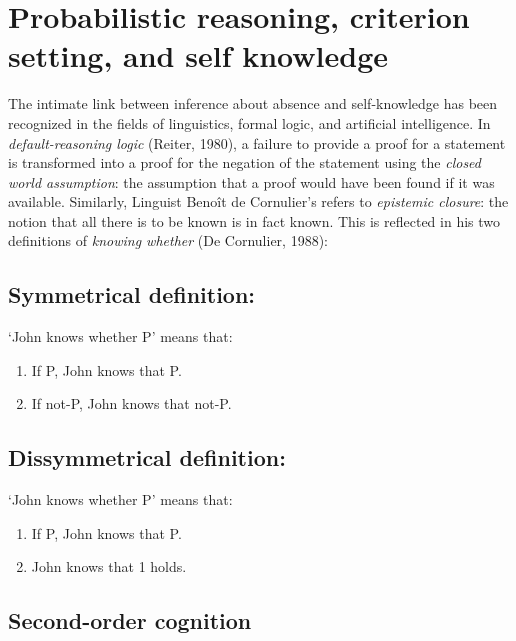 \documentclass[12pt,twoside]{reedthesis}
\providecommand{\tightlist}{%
  \setlength{\itemsep}{0pt}\setlength{\parskip}{0pt}}
\begin{document}
\hypertarget{formalabsence}{%
\section{Probabilistic reasoning, criterion setting, and self knowledge}\label{formalabsence}}

The intimate link between inference about absence and self-knowledge has been recognized in the fields of linguistics, formal logic, and artificial intelligence. In \emph{default-reasoning logic} (Reiter, 1980), a failure to provide a proof for a statement is transformed into a proof for the negation of the statement using the \emph{closed world assumption}: the assumption that a proof would have been found if it was available. Similarly, Linguist Benoît de Cornulier's refers to \emph{epistemic closure}: the notion that all there is to be known is in fact known. This is reflected in his two definitions of \emph{knowing whether} (De Cornulier, 1988):

\hypertarget{symmetrical-definition}{%
\subsection*{Symmetrical definition:}\label{symmetrical-definition}}

`John knows whether P' means that:
\begin{enumerate}
\def\labelenumi{\arabic{enumi}.}
\tightlist
\item
  If P, John knows that P.
\item
  If not-P, John knows that not-P.
\end{enumerate}
\hypertarget{dissymmetrical-definition}{%
\subsection*{Dissymmetrical definition:}\label{dissymmetrical-definition}}

`John knows whether P' means that:
\begin{enumerate}
\def\labelenumi{\arabic{enumi}.}
\tightlist
\item
  If P, John knows that P.
\item
  John knows that 1 holds.
\end{enumerate}
\hypertarget{intro-2nd-order}{%
\subsection{Second-order cognition}\label{intro-2nd-order}}
\end{document}
